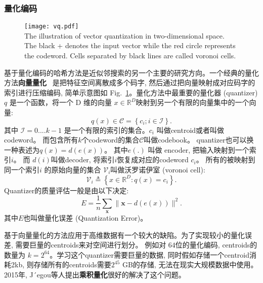 \subsubsection{量化编码}
\begin{figure}[!htp]
    \centering
    \texttt{[image: vq.pdf]} \\
      {The illustration of vector quantization in two-dimensional space. The black + denotes the input vector while the red circle represents the codeword. Cells separated by black lines are called voronoi cells. }
   \label{fig:vectorquant}
\end{figure}
基于量化编码的哈希方法是近似邻搜索的另一个主要的研究方向。一个经典的量化方法\textbf{向量量化} ~\cite{gray1984vector}是把特征空间离散成多个码字, 然后通过把向量映射成对应码字的索引进行压缩编码, 简单示意图如 Fig.~\ref{fig:vectorquant}。量化方法中最重要的量化器 (quantizer)  $q$ 是一个函数，将一个 D 维的向量 $x \in \mathbb{R}^D$映射到另一个有限的向量集中的一个向量:
\begin{equation}
    q(x) \in \mathcal{C} = \left \{ c_i; i \in  \mathcal{I}\right\}.
    \label{eq:vector}
\end{equation}
其中 $\mathcal{I} = 0 .... k-1$ 是一个有限的索引的集合。$c_i$ 叫做centroid或者叫做codeword。  而包含所有$k$个codeword的集合$\mathcal{C}$叫做codebook。 quantizer也可以换一种表述为$q(x) = d(e(x))$。 其中$e(.)$ 叫做 encoder, 把输入映射到一个索引$i$。 而 $d(i)$叫做decoder, 将索引$i$恢复成对应的codeword $c_i$。 所有的被映射到同一个索引$i$ 的原始向量的集合 $\mathcal{V}_i$叫做沃罗诺伊室 (voronoi cell):
\begin{equation}
    \mathcal{V}_i \triangleq\left\{x \in \mathbb{R}^D: q(x)=c_i\right\}.
\end{equation}
Quantizer的质量评估一般是由以下决定:
\begin{equation}
    E=\frac{1}{n} \sum_{\mathbf{x}}\|\mathbf{x}- d(e(x))\|^2.
\end{equation}
其中$E$也叫做量化误差 (Quantization Error)。\par
基于向量量化的方法应用于高维数据有一个较大的缺陷。为了实现较小的量化误差, 需要巨量的centroids来对空间进行划分。 例如对 $64$位的量化编码, centroids的数量为 $k = 2^{64}$。学习这个quantizer需要巨量的数据, 同时假如存储一个centroid消耗2kb, 则存储所有的centroids需要$2^{45}$ GB的存储, 无法在现实大规模数据中使用。 2015年, J´egou等人提出\textbf{乘积量化}很好的解决了这个问题。\par
